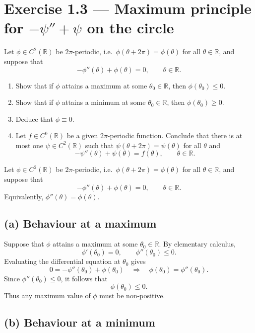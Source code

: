 \documentclass[12pt,a4paper]{article}
\theoremstyle{plain}
\theoremstyle{definition}
\theoremstyle{remark}
\theoremstyle{remark}
\begin{document}
\section*{Exercise 1.3 — Maximum principle for $-\psi''+\psi$ on the circle}

Let $\phi\in C^2(\mathbb{R})$ be $2\pi$-periodic, i.e.\ $\phi(\theta+2\pi)
= \phi(\theta)$ for all $\theta\in\mathbb{R}$, and suppose that
\[
-\phi''(\theta) + \phi(\theta) = 0, \qquad \theta\in\mathbb{R}.
\]

\begin{enumerate}
	\item[(a)] Show that if $\phi$ attains a maximum at some $\theta_0\in\mathbb{R}$,
	then $\phi(\theta_0)\le 0$.
	
	\item[(b)] Show that if $\phi$ attains a minimum at some $\theta_0\in\mathbb{R}$,
	then $\phi(\theta_0)\ge 0$.
	
	\item[(c)] Deduce that $\phi\equiv 0$.
	
	\item[(d)] Let $f\in C^0(\mathbb{R})$ be a given $2\pi$-periodic function.
	Conclude that there is at most one $\psi\in C^2(\mathbb{R})$ such
	that $\psi(\theta+2\pi)=\psi(\theta)$ for all $\theta$ and
	\[
	-\psi''(\theta) + \psi(\theta) = f(\theta),
	\qquad \theta\in\mathbb{R}.
	\]
\end{enumerate}

Let $\phi\in C^2(\mathbb{R})$ be $2\pi$-periodic, i.e.\ $\phi(\theta+2\pi)=\phi(\theta)$
for all $\theta\in\mathbb{R}$, and suppose that
\[
-\phi''(\theta) + \phi(\theta) = 0, \qquad \theta\in\mathbb{R}.
\]
Equivalently, $\phi''(\theta)=\phi(\theta)$.

\subsection*{(a) Behaviour at a maximum}

Suppose that $\phi$ attains a maximum at some $\theta_0\in\mathbb{R}$.
By elementary calculus,
\[
\phi'(\theta_0) = 0, \qquad \phi''(\theta_0)\le 0.
\]
Evaluating the differential equation at $\theta_0$ gives
\[
0 = -\phi''(\theta_0)+\phi(\theta_0)
\quad\Longrightarrow\quad
\phi(\theta_0) = \phi''(\theta_0).
\]
Since $\phi''(\theta_0)\le 0$, it follows that
\[
\phi(\theta_0)\le 0.
\]
Thus any maximum value of $\phi$ must be non-positive.

\subsection*{(b) Behaviour at a minimum}
\end{document}
